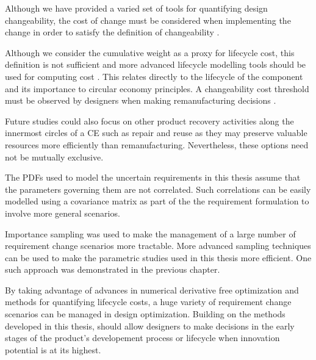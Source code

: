 Although we have provided a varied set of tools for quantifying design changeability, the cost of change must be considered when implementing the change in order to satisfy the definition of changeability \cite{Lawand2019}.

Although we consider the cumulative weight as a proxy for lifecycle cost, this definition is not sufficient and more advanced lifecycle modelling tools should be used for computing cost \cite{Lawand2019}. This relates directly to the lifecycle of the component and its importance to circular economy principles. A changeability cost threshold must be observed by designers when making remanufacturing decisions \cite{Ross2008}. 

Future studies could also focus on other product recovery activities along the innermost circles of a \ac{CE} such as repair and reuse as they may preserve valuable resources more efficiently than remanufacturing. Nevertheless, these options need not be mutually exclusive.

The \acp{PDF} used to model the uncertain requirements in this thesis assume that the parameters governing them are not correlated. Such correlations can be easily modelled using a covariance matrix as part of the the requirement formulation to involve more general scenarios. 

Importance sampling was used to make the management of a large number of requirement change scenarios more tractable. More advanced sampling techniques can be used to make the parametric studies used in this thesis more efficient. One such approach was demonstrated in the previous chapter.

By taking advantage of advances in numerical derivative free optimization and methods for quantifying lifecycle costs, a huge variety of requirement change scenarios can be managed in design optimization. Building on the methods developed in this thesis, should allow designers to make decisions in the early stages of the product's developement process or lifecycle when innovation potential is at its highest.